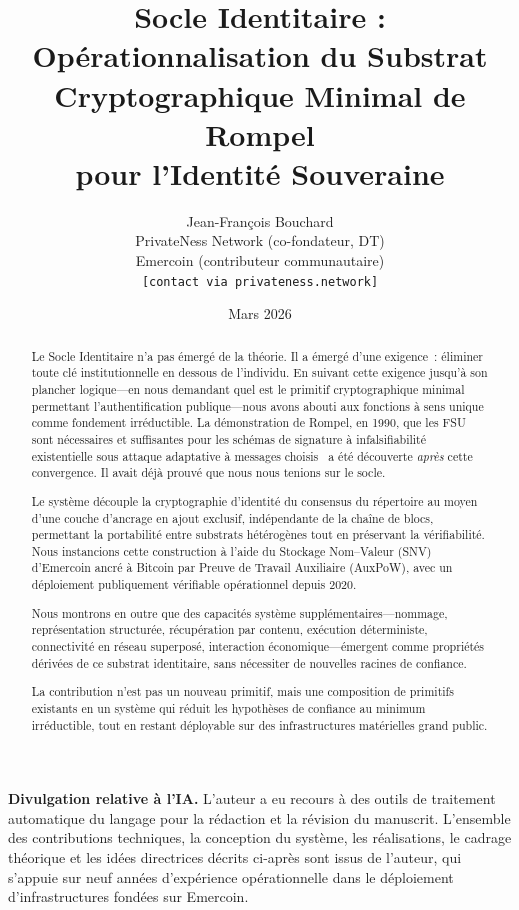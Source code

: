 \documentclass[11pt,a4paper]{article}
\title{\textbf{Socle Identitaire : Opérationnalisation du Substrat\\
Cryptographique Minimal de Rompel\\
pour l'Identité Souveraine}}
\author{Jean-François Bouchard\\
  \small PrivateNess Network (co-fondateur, DT)\\
  \small Emercoin (contributeur communautaire)\\
  \small \texttt{[contact via privateness.network]}}
\date{Mars 2026}
\begin{document}
\maketitle

\noindent\textbf{Divulgation relative à l'IA.} L'auteur a eu recours à des
outils de traitement automatique du langage pour la rédaction et la révision
du manuscrit.  L'ensemble des contributions techniques, la conception du
système, les réalisations, le cadrage théorique et les idées directrices
décrits ci-après sont issus de l'auteur, qui s'appuie sur neuf années
d'expérience opérationnelle dans le déploiement d'infrastructures fondées sur
Emercoin.

\begin{abstract}
Le Socle Identitaire n'a pas émergé de la théorie.  Il a émergé d'une
exigence~: éliminer toute clé institutionnelle en dessous de l'individu.  En
suivant cette exigence jusqu'à son plancher logique---en nous demandant quel
est le primitif cryptographique minimal permettant l'authentification
publique---nous
avons abouti aux fonctions à sens unique comme fondement irréductible.  La
démonstration de Rompel, en 1990, que les FSU sont nécessaires et suffisantes
pour les schémas de signature à infalsifiabilité existentielle sous attaque
adaptative à messages choisis~\cite{rompel1990} a été découverte \emph{après}
cette convergence.  Il avait déjà prouvé que nous nous tenions sur le socle.

Le système découple la cryptographie d'identité du consensus du répertoire
au moyen d'une couche d'ancrage en ajout exclusif, indépendante de la chaîne
de blocs, permettant la portabilité entre substrats hétérogènes tout en
préservant la vérifiabilité.  Nous instancions cette construction à l'aide du Stockage
Nom--Valeur (SNV) d'Emercoin ancré à Bitcoin par Preuve de Travail Auxiliaire
(AuxPoW), avec un déploiement publiquement vérifiable opérationnel depuis 2020.

Nous montrons en outre que des capacités système supplémentaires---nommage,
représentation structurée, récupération par contenu, exécution déterministe,
connectivité en réseau superposé, interaction économique---émergent comme
propriétés dérivées de ce substrat identitaire, sans nécessiter de nouvelles
racines de confiance.

La contribution n'est pas un nouveau primitif, mais une composition de
primitifs existants en un système qui réduit les hypothèses de confiance au
minimum irréductible, tout en restant déployable sur des infrastructures
matérielles grand public.
\end{abstract}
\end{document}
